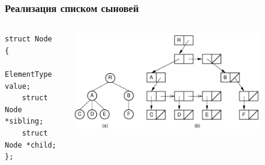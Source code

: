 \documentclass[xetex,mathserif,serif]{beamer}
\begin{document}
    \begin{frame}[fragile]
        \frametitle{Реализация списком сыновей}
        \begin{columns}
            \begin{column}{0.3\textwidth}
                \begin{footnotesize}
                    \begin{verbatim}
struct Node
{
    ElementType value;
    struct Node *sibling;
    struct Node *child;
};
                    \end{verbatim}
                \end{footnotesize}
            \end{column}
            \begin{column}{0.7\textwidth}
                \begin{center}
                    \includegraphics[width=0.8\textwidth]{children-list.png}
                \end{center}
            \end{column}
        \end{columns}
    \end{frame}
\end{document}
